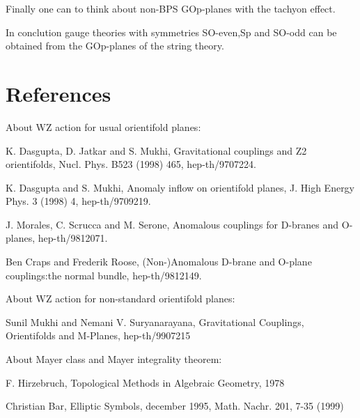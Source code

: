 \documentclass[a4paper,a4paper]{article}
\begin{document}
Finally one can to think about non-BPS GOp-planes with the tachyon effect.

In conclution gauge theories with symmetries SO-even,Sp and SO-odd can be obtained from the GOp-planes of the string theory.

\section{References}

\setlength{\baselineskip}{20pt}
About WZ action for usual orientifold planes:

K. Dasgupta, D. Jatkar and S. Mukhi, Gravitational couplings and Z2 orientifolds, Nucl. Phys. B523 (1998) 465, hep-th/9707224.

K. Dasgupta and S. Mukhi, Anomaly inflow on orientifold planes, J. High Energy Phys. 3 (1998) 4, hep-th/9709219.

J. Morales, C. Scrucca and M. Serone, Anomalous couplings for D-branes and O-planes, hep-th/9812071.

Ben Craps and Frederik Roose, (Non-)Anomalous D-brane and O-plane couplings:the normal bundle,  hep-th/9812149.

About WZ action for non-standard orientifold planes:

Sunil Mukhi and Nemani V. Suryanarayana,  Gravitational Couplings, Orientifolds and M-Planes,  hep-th/9907215


About Mayer class and Mayer integrality theorem:

F. Hirzebruch, Topological Methods in Algebraic Geometry, 1978

Christian Bar,  Elliptic Symbols, december 1995, Math. Nachr. 201, 7-35 (1999)

\setlength{\baselineskip}{50pt}   
\end{document}
